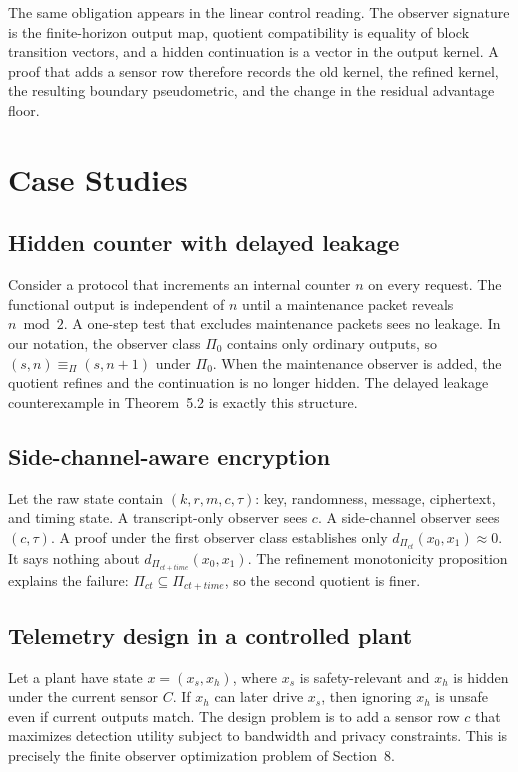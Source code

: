 \documentclass[11pt]{article}
\theoremstyle{definition}
\theoremstyle{plain}
\theoremstyle{remark}
\newcommand{\eqobs}{\equiv_{\Pi}}
\begin{document}
The same obligation appears in the linear control reading. The observer signature is the finite-horizon output map, quotient compatibility is equality of block transition vectors, and a hidden continuation is a vector in the output kernel. A proof that adds a sensor row therefore records the old kernel, the refined kernel, the resulting boundary pseudometric, and the change in the residual advantage floor.

\section{Case Studies}

\subsection{Hidden counter with delayed leakage}

Consider a protocol that increments an internal counter $n$ on every request. The functional output is independent of $n$ until a maintenance packet reveals $n\bmod 2$. A one-step test that excludes maintenance packets sees no leakage. In our notation, the observer class $\Pi_0$ contains only ordinary outputs, so $(s,n)\eqobs(s,n+1)$ under $\Pi_0$. When the maintenance observer is added, the quotient refines and the continuation is no longer hidden. The delayed leakage counterexample in Theorem~5.2 is exactly this structure.

\subsection{Side-channel-aware encryption}

Let the raw state contain $(k,r,m,c,\tau)$: key, randomness, message, ciphertext, and timing state. A transcript-only observer sees $c$. A side-channel observer sees $(c,\tau)$. A proof under the first observer class establishes only $d_{\Pi_{ct}}(x_0,x_1)\approx0$. It says nothing about $d_{\Pi_{ct+time}}(x_0,x_1)$. The refinement monotonicity proposition explains the failure: $\Pi_{ct}\subseteq\Pi_{ct+time}$, so the second quotient is finer.

\subsection{Telemetry design in a controlled plant}

Let a plant have state $x=(x_s,x_h)$, where $x_s$ is safety-relevant and $x_h$ is hidden under the current sensor $C$. If $x_h$ can later drive $x_s$, then ignoring $x_h$ is unsafe even if current outputs match. The design problem is to add a sensor row $c$ that maximizes detection utility subject to bandwidth and privacy constraints. This is precisely the finite observer optimization problem of Section~8.
\end{document}
